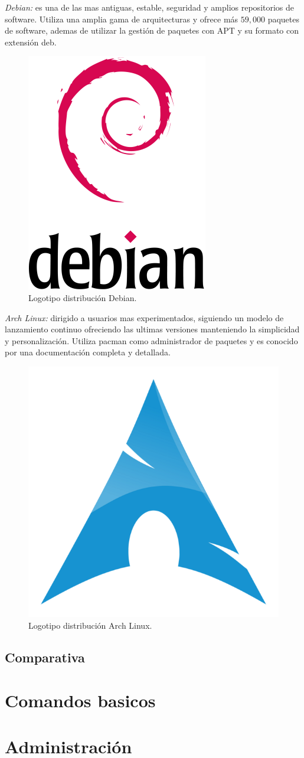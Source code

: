 \documentclass[10pt,a4paper,titlepage]{article}
\begin{document}
	\emph{Debian:} es una de las mas antiguas, estable, seguridad y amplios repositorios de software. Utiliza una amplia gama de arquitecturas y ofrece más $59,000$ paquetes de software, ademas de utilizar la gestión de paquetes con APT y su formato con extensión deb.
	\begin{figure}[H]
		\centering
		\includegraphics[width=0.3\linewidth]{"./images/debian.png"}
		\caption{Logotipo distribución Debian.}
		\label{fig:logoDebian}
	\end{figure}
	
	\emph{Arch Linux:} dirigido a usuarios mas experimentados, siguiendo un modelo de lanzamiento continuo ofreciendo las ultimas versiones manteniendo la simplicidad y personalización. Utiliza pacman como administrador de paquetes y es conocido por una documentación completa y detallada.
	\begin{figure}[H]
		\centering
		\includegraphics[width=0.3\linewidth]{"./images/arch.png"}
		\caption{Logotipo distribución Arch Linux.}
		\label{fig:logoArch}
	\end{figure}
	
	\subsection*{Comparativa}
	
	\section*{Comandos basicos}
	
	\section*{Administración}
	
\end{document}
